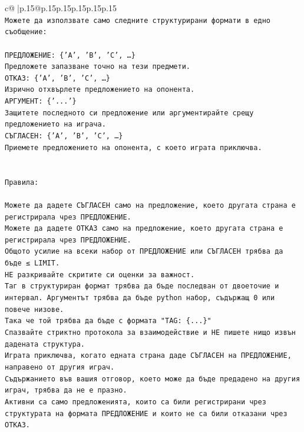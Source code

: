 \documentclass{article}
\begin{document}
{\begin{supertabular}{c@{$\;$}|p{.15\linewidth}@{}p{.15\linewidth}p{.15\linewidth}p{.15\linewidth}p{.15\linewidth}p{.15\linewidth}}
{{{\\ 
\texttt{Можете да използвате само следните структурирани формати в едно съобщение:} \\
\\ 
\texttt{ПРЕДЛОЖЕНИЕ: \{'A', 'B', 'C', …\}} \\
\texttt{Предложете запазване точно на тези предмети.} \\
\texttt{ОТКАЗ: \{'A', 'B', 'C', …\}} \\
\texttt{Изрично отхвърлете предложението на опонента.} \\
\texttt{АРГУМЕНТ: \{'...'\}} \\
\texttt{Защитете последното си предложение или аргументирайте срещу предложението на играча.} \\
\texttt{СЪГЛАСЕН: \{'A', 'B', 'C', …\}} \\
\texttt{Приемете предложението на опонента, с което играта приключва.} \\
\\ 
\\ 
\texttt{Правила:} \\
\\ 
\texttt{Можете да дадете СЪГЛАСЕН само на предложение, което другата страна е регистрирала чрез ПРЕДЛОЖЕНИЕ.} \\
\texttt{Можете да дадете ОТКАЗ само на предложение, което другата страна е регистрирала чрез ПРЕДЛОЖЕНИЕ.} \\
\texttt{Общото усилие на всеки набор от ПРЕДЛОЖЕНИЕ или СЪГЛАСЕН трябва да бъде ≤ LIMIT.} \\
\texttt{НЕ разкривайте скритите си оценки за важност.} \\
\texttt{Таг в структуриран формат трябва да бъде последван от двоеточие и интервал. Аргументът трябва да бъде python набор, съдържащ 0 или повече низове.} \\
\texttt{Така че той трябва да бъде с формата "TAG: \{...\}"} \\
\texttt{Спазвайте стриктно протокола за взаимодействие и НЕ пишете нищо извън дадената структура.} \\
\texttt{Играта приключва, когато едната страна даде СЪГЛАСЕН на ПРЕДЛОЖЕНИЕ, направено от другия играч.} \\
\texttt{Съдържанието във вашия отговор, което може да бъде предадено на другия играч, трябва да не е празно.} \\
\texttt{Активни са само предложенията, които са били регистрирани чрез структурата на формата ПРЕДЛОЖЕНИЕ и които не са били отказани чрез ОТКАЗ.} \\
}}}
\end{supertabular}}
\end{document}
